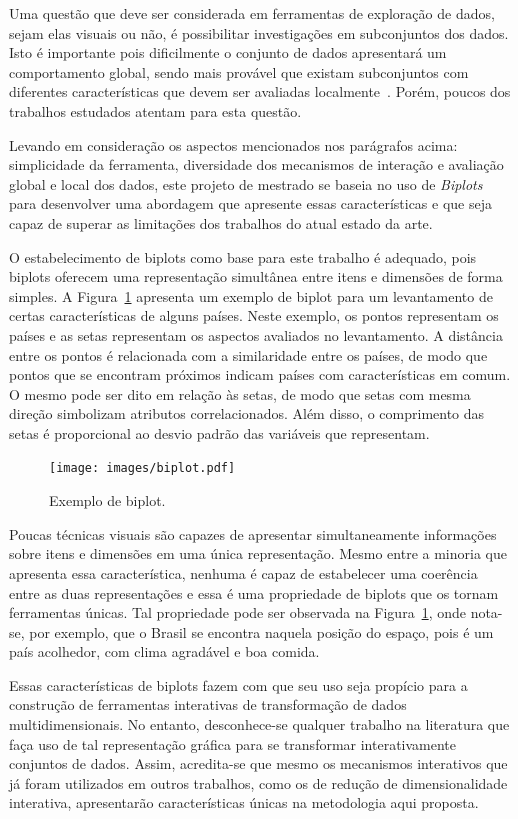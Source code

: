 Uma questão que deve ser considerada em ferramentas de
exploração de dados, sejam elas visuais ou não, é
possibilitar investigações em subconjuntos dos dados. Isto é
importante pois dificilmente o conjunto de dados apresentará
um comportamento global, sendo mais provável que existam
subconjuntos com diferentes características que devem ser
avaliadas localmente~\cite{May2011}. Porém, poucos dos
trabalhos estudados atentam para esta questão.

Levando em consideração os aspectos mencionados nos
parágrafos acima: simplicidade da ferramenta, diversidade
dos mecanismos de interação e avaliação global e local dos
dados, este projeto de mestrado se baseia no uso de
\emph{Biplots}~\cite{Gabriel1971} para desenvolver uma
abordagem que apresente essas características e que seja
capaz de superar as limitações dos trabalhos do atual estado
da arte.

O estabelecimento de biplots como base para este trabalho é
adequado, pois biplots oferecem uma representação simultânea
entre itens e dimensões de forma simples. A
Figura~\ref{fig:biplot} apresenta um exemplo de biplot para
um levantamento de certas características de alguns países.
Neste exemplo, os pontos representam os países e as setas
representam os aspectos avaliados no levantamento. A
distância entre os pontos é relacionada com a similaridade
entre os países, de modo que pontos que se encontram
próximos indicam países com características em comum. O
mesmo pode ser dito em relação às setas, de modo que setas
com mesma direção simbolizam atributos correlacionados. Além
disso, o comprimento das setas é proporcional ao desvio
padrão das variáveis que representam.

\begin{figure}[h!]
    \centering
    \texttt{[image: images/biplot.pdf]}
    \caption{Exemplo de biplot.}
    \label{fig:biplot}
\end{figure}

Poucas técnicas visuais são capazes de apresentar
simultaneamente informações sobre itens e dimensões em uma
única representação. Mesmo entre a minoria que apresenta
essa característica, nenhuma é capaz de estabelecer uma
coerência entre as duas representações e essa é uma
propriedade de biplots que os tornam ferramentas únicas. Tal
propriedade pode ser observada na Figura~\ref{fig:biplot},
onde nota-se, por exemplo, que o Brasil se encontra naquela
posição do espaço, pois é um país acolhedor, com clima
agradável e boa comida. 

Essas características de biplots fazem com que seu uso seja
propício para a construção de ferramentas interativas de
transformação de dados multidimensionais. No entanto,
desconhece-se qualquer trabalho na literatura que faça uso
de tal representação gráfica para se transformar
interativamente conjuntos de dados. Assim, acredita-se que
mesmo os mecanismos interativos que já foram utilizados em
outros trabalhos, como os de redução de dimensionalidade
interativa, apresentarão características únicas na
metodologia aqui proposta.

